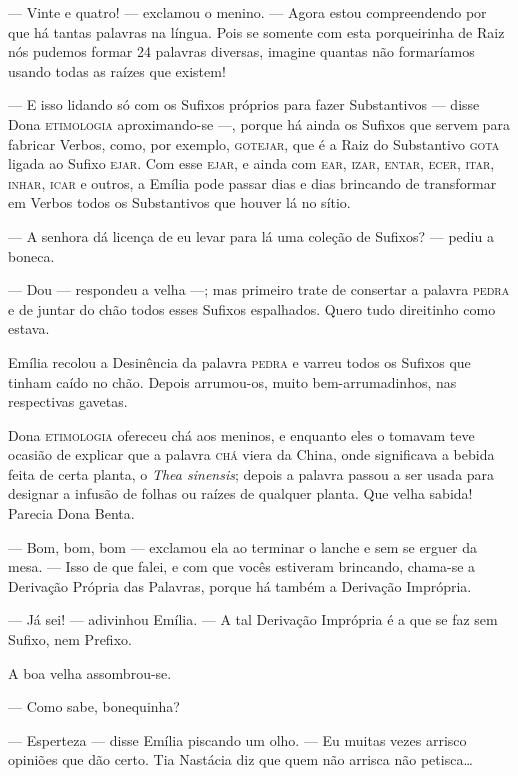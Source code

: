 --- Vinte e quatro! --- exclamou o menino. --- Agora estou compreendendo
por que há tantas palavras na língua. Pois se somente com esta
porqueirinha de Raiz nós pudemos formar 24 palavras diversas, imagine
quantas não formaríamos usando todas as raízes que existem!

--- E isso lidando só com os Sufixos próprios para fazer Substantivos
--- disse Dona \textsc{etimologia} aproximando-se ---, porque há ainda os Sufixos
que servem para fabricar Verbos, como, por exemplo, \textsc{gotejar}, que é a
Raiz do Substantivo \textsc{gota} ligada ao Sufixo \textsc{ejar}. Com esse \textsc{ejar}, e ainda
com \textsc{ear}, \textsc{izar}, \textsc{entar}, \textsc{ecer}, \textsc{itar}, \textsc{inhar}, \textsc{icar} e outros, a Emília pode
passar dias e dias brincando de transformar em Verbos todos os
Substantivos que houver lá no sítio.

--- A senhora dá licença de eu levar para lá uma coleção de Sufixos? ---
pediu a boneca.

--- Dou --- respondeu a velha ---; mas primeiro trate de consertar a
palavra \textsc{pedra} e de juntar do chão todos esses Sufixos espalhados. Quero
tudo direitinho como estava.

Emília recolou a Desinência da palavra \textsc{pedra} e varreu todos os Sufixos
que tinham caído no chão. Depois arrumou-os, muito bem-arrumadinhos, nas
respectivas gavetas.

Dona \textsc{etimologia} ofereceu chá aos meninos, e enquanto eles o tomavam teve
ocasião de explicar que a palavra \textsc{chá} viera da China, onde significava a
bebida feita de certa planta, o \textit{Thea sinensis}; depois a palavra
passou a ser usada para designar a infusão de folhas ou raízes de
qualquer planta. Que velha sabida! Parecia Dona Benta.

--- Bom, bom, bom --- exclamou ela ao terminar o lanche e sem se erguer
da mesa. --- Isso de que falei, e com que vocês estiveram brincando,
chama-se a Derivação Própria das Palavras, porque há também a Derivação
Imprópria.

--- Já sei! --- adivinhou Emília. --- A tal Derivação Imprópria é a que
se faz sem Sufixo, nem Prefixo.

A boa velha assombrou-se.

--- Como sabe, bonequinha?

--- Esperteza --- disse Emília piscando um olho. --- Eu muitas vezes
arrisco opiniões que dão certo. Tia Nastácia diz que quem não arrisca
não petisca\ldots{}

